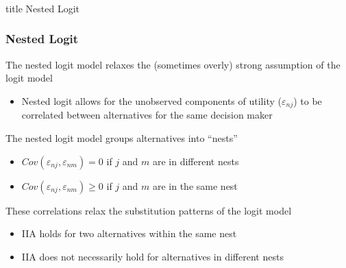 \documentclass{beamer}
\begin{document}
\begin{frame}\frametitle{}
    \vfill
    \centering
    \begin{beamercolorbox}[center]{title}
        \Large Nested Logit
    \end{beamercolorbox}
    \vfill
\end{frame}

\begin{frame}\frametitle{Nested Logit}
    The nested logit model relaxes the (sometimes overly) strong assumption of the logit model
    \begin{itemize}
    	\item Nested logit allows for the unobserved components of utility ($\varepsilon_{nj}$) to be correlated between alternatives for the same decision maker
    \end{itemize}
    \vspace{2ex}
    The nested logit model groups alternatives into ``nests''
    \begin{itemize}
    	\item $Cov(\varepsilon_{nj}, \varepsilon_{nm}) = 0$ if $j$ and $m$ are in different nests
    	\item $Cov(\varepsilon_{nj}, \varepsilon_{nm}) \geq 0$ if $j$ and $m$ are in the same nest
    \end{itemize}
    \vspace{2ex}
    These correlations relax the substitution patterns of the logit model
    \begin{itemize}
    	\item IIA holds for two alternatives within the same nest
    	\item IIA does not necessarily hold for alternatives in different nests
    \end{itemize}
\end{frame}
\end{document}
